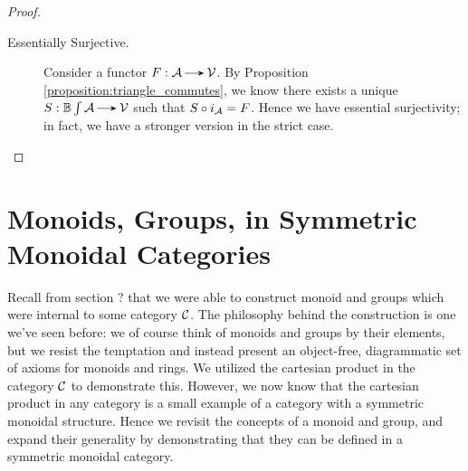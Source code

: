 \begin{proof}
\begin{description}
    \item[Essentially Surjective.]
        Consider a functor $F: \aa \to \vv$. 
        By Proposition \ref{proposition:triangle_commutes}, we know there exists 
        a unique $S: \mathbb{B}\int\aa \to \vv$ such 
        that $S \circ i_{\aa} = F$. 
        Hence we have essential surjectivity; in fact, we have 
        a stronger version in the strict case.
    \end{description}
\end{proof}


\newpage
\section{Monoids, Groups, in Symmetric Monoidal Categories}
Recall from section ? that we were able to construct monoid and groups which 
were internal to some category $\cc$. The philosophy behind the construction 
is one we've seen before: we of course think of monoids and groups by their elements, 
but we resist the temptation and instead present an object-free, diagrammatic 
set of axioms for monoids and rings. We utilized the cartesian product in the 
category $\cc$ to demonstrate this. However, we now know that the cartesian 
product in any category is a small example of a category with a symmetric monoidal structure. 
Hence we revisit the concepts of a monoid and group, and expand their 
generality by demonstrating that they can be defined in a symmetric monoidal category. 

